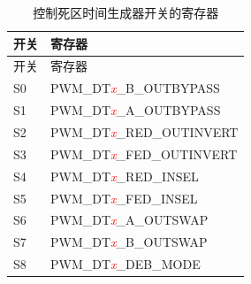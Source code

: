 \begin{longtable}[c]{ |p{4cm}|p{10cm}| }
    \caption{控制死区时间生成器开关的寄存器}
    \label{table:s_dt}
    \\\hline
    \rowcolor{lightgray}
   开关
    & 寄存器
    \\\hline
    \endfirsthead
    \hline
    \rowcolor{lightgray}   
    开关
    & 寄存器
    \\\hline
    \endhead
    \hline
    \endfoot
    S0
    & PWM\_DT\textcolor{red}{\it{x}}\_B\_OUTBYPASS
    \\\hline
    S1
    & PWM\_DT\textcolor{red}{\it{x}}\_A\_OUTBYPASS
    \\\hline
    S2
    & PWM\_DT\textcolor{red}{\it{x}}\_RED\_OUTINVERT
    \\\hline
    S3
    & PWM\_DT\textcolor{red}{\it{x}}\_FED\_OUTINVERT
    \\\hline
    S4
    & PWM\_DT\textcolor{red}{\it{x}}\_RED\_INSEL
    \\\hline
    S5
    & PWM\_DT\textcolor{red}{\it{x}}\_FED\_INSEL
    \\\hline
    S6
    & PWM\_DT\textcolor{red}{\it{x}}\_A\_OUTSWAP
    \\\hline
    S7
    & PWM\_DT\textcolor{red}{\it{x}}\_B\_OUTSWAP
    \\\hline
    S8
    & PWM\_DT\textcolor{red}{\it{x}}\_DEB\_MODE
    \\\hline
\end{longtable}